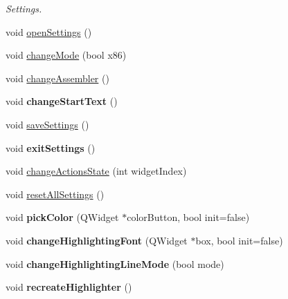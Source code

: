 \begin{DoxyCompactItemize}
\begin{DoxyCompactList}\small\item\em Settings. \end{DoxyCompactList}\item 
void \hyperlink{class_main_window_a8e1c1ad87a68b27f19492549b9c4e773}{open\+Settings} ()
\item 
void \hyperlink{class_main_window_a31a22d06907f6f37fe53b3c1a78a27c4}{change\+Mode} (bool x86)
\item 
void \hyperlink{class_main_window_a117cad33e07cf5743d10390224ce9b20}{change\+Assembler} ()
\item 
\hypertarget{class_main_window_adc2c6917bad92be5f29b3f03bdcf3e2f}{}void {\bfseries change\+Start\+Text} ()\label{class_main_window_adc2c6917bad92be5f29b3f03bdcf3e2f}

\item 
void \hyperlink{class_main_window_abb30531afee763d0586ee6323fd332e2}{save\+Settings} ()
\item 
\hypertarget{class_main_window_a8d8a4882d5f3bfd14c1a9ad099cfed34}{}void {\bfseries exit\+Settings} ()\label{class_main_window_a8d8a4882d5f3bfd14c1a9ad099cfed34}

\item 
void \hyperlink{class_main_window_aee3cd5b22f4b0ec8e98b0a56d21e2ce4}{change\+Actions\+State} (int widget\+Index)
\item 
void \hyperlink{class_main_window_a03a1eafa1b4d6b1214767f408cbcf8c7}{reset\+All\+Settings} ()
\item 
\hypertarget{class_main_window_ad750f8cf1395c0383b01c97fe65cd515}{}void {\bfseries pick\+Color} (Q\+Widget $\ast$color\+Button, bool init=false)\label{class_main_window_ad750f8cf1395c0383b01c97fe65cd515}

\item 
\hypertarget{class_main_window_aec4ed4286d88e04c131cb882050c3fec}{}void {\bfseries change\+Highlighting\+Font} (Q\+Widget $\ast$box, bool init=false)\label{class_main_window_aec4ed4286d88e04c131cb882050c3fec}

\item 
\hypertarget{class_main_window_a588a4be0d3b05980878a5fa660996fc2}{}void {\bfseries change\+Highlighting\+Line\+Mode} (bool mode)\label{class_main_window_a588a4be0d3b05980878a5fa660996fc2}

\item 
\hypertarget{class_main_window_a6f43cd45a2b2ef207cabe97a8d8941e3}{}void {\bfseries recreate\+Highlighter} ()\label{class_main_window_a6f43cd45a2b2ef207cabe97a8d8941e3}


\end{DoxyCompactItemize}
